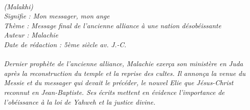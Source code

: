 \BFont
\noindent\hrulefill
{\footnotesize
\textit{
\bigskip
{\centering{}
\\(Malakhi)
\\Signifie : Mon messager, mon ange
\\Thème : Message final de l'ancienne alliance à une nation désobéissante
\\Auteur : Malachie
\\Date de rédaction : 5ème siècle av. J.-C.\\}
}
\textit{
\\Dernier prophète de l’ancienne alliance, Malachie exerça son ministère en Juda après la reconstruction du temple et la reprise des cultes. Il annonça la venue du Messie et du messager qui devait le précéder, le nouvel Elie que Jésus-Christ reconnut en Jean-Baptiste. Ses écrits mettent en évidence l’importance de l’obéissance à la loi de Yahweh et la justice divine.\bigskip
}
}
\par\nobreak\noindent\hrulefill
